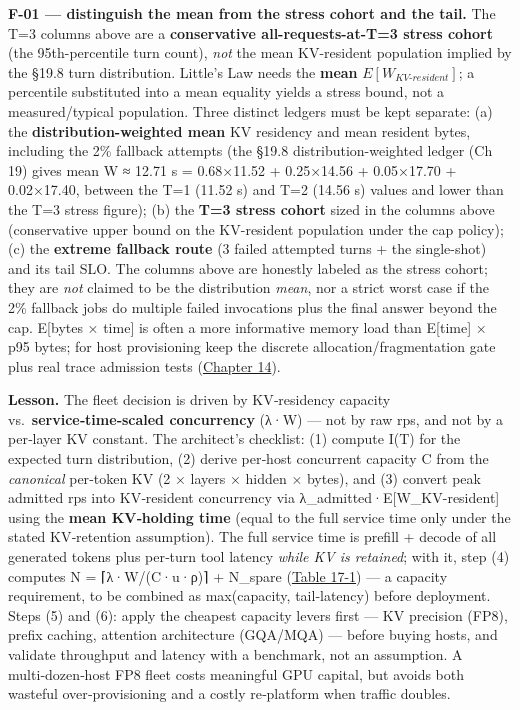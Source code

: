 \textbf{F-01 --- distinguish the mean from the stress cohort and the
tail.} The T=3 columns above are a \textbf{conservative
all-requests-at-T=3 stress cohort} (the 95th-percentile turn count),
\emph{not} the mean KV-resident population implied by the §19.8 turn
distribution. Little's Law needs the \textbf{mean}
\(E[W_{KV\text{-}resident}]\); a percentile substituted into a mean
equality yields a stress bound, not a measured/typical population. Three
distinct ledgers must be kept separate: (a) the
\textbf{distribution-weighted mean} KV residency and mean resident
bytes, including the 2\% fallback attempts (the §19.8
distribution-weighted ledger (Ch 19) gives mean W ≈ 12.71 s = 0.68×11.52
+ 0.25×14.56 + 0.05×17.70 + 0.02×17.40, between the T=1 (11.52 s) and
T=2 (14.56 s) values and lower than the T=3 stress figure); (b) the
\textbf{T=3 stress cohort} sized in the columns above (conservative
upper bound on the KV-resident population under the cap policy); (c) the
\textbf{extreme fallback route} (3 failed attempted turns + the
single-shot) and its tail SLO. The columns above are honestly labeled as
the stress cohort; they are \emph{not} claimed to be the distribution
\emph{mean}, nor a strict worst case if the 2\% fallback jobs do
multiple failed invocations plus the final answer beyond the cap.
E{[}bytes × time{]} is often a more informative memory load than
E\mbox{{[}time{]}} × p95 bytes; for host provisioning keep the discrete
allocation/fragmentation gate plus real trace admission tests (\hyperref[chap:14]{Chapter 14}).

\textbf{Lesson.} The fleet decision is driven by KV‑residency capacity
vs.~\textbf{service‑time‑scaled concurrency} (λ·W) --- not by raw rps,
and not by a per‑layer KV constant. The architect's checklist: (1)
compute I(T) for the expected turn distribution, (2) derive per‑host
concurrent capacity C from the \emph{canonical} per‑token KV (2 × layers
× hidden × bytes), and (3) convert peak admitted rps into KV‑resident
concurrency via λ\_admitted·E{[}W\_KV-resident{]} using the \textbf{mean
KV‑holding time} (equal to the full service time only under the stated
KV‑retention assumption). The full service time is prefill + decode of
all generated tokens plus per‑turn tool latency \emph{while KV is
retained}; with it, step (4) computes N = ⌈λ·W/(C·u·ρ)⌉ + N\_spare
(\hyperref[tab:17.1]{Table 17-1}) --- a capacity requirement, to be combined as max(capacity,
tail‑latency) before deployment. Steps (5) and (6): apply the cheapest
capacity levers first --- KV precision (FP8), prefix caching, attention
architecture (GQA/MQA) --- before buying hosts, and validate throughput
and latency with a benchmark, not an assumption. A multi‑dozen‑host FP8
fleet costs meaningful GPU capital, but avoids both wasteful
over‑provisioning and a costly re‑platform when traffic doubles.

